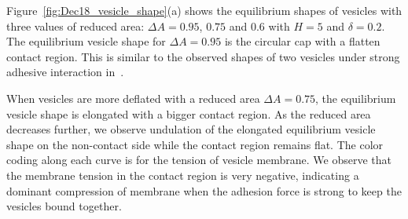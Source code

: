 \documentclass[prf,superscriptaddress,showpacs]{revtex4-1}
\begin{document}
Figure~\ref{fig:Dec18_vesicle_shape}(a) shows the equilibrium shapes of
vesicles with three values of reduced area: $\Delta A=0.95$, $0.75$ and
$0.6$ with $H=5$  and $\delta = 0.2$.  The equilibrium vesicle shape for
$\Delta A=0.95$ is the circular cap with a flatten contact region.  This
is similar to the observed shapes of two vesicles under strong adhesive
interaction
in~\cite{RamachandranAndersonLealIsraelachvili2010_Langmuir}.

When vesicles are more deflated with a reduced area  $\Delta A = 0.75$, the equilibrium vesicle shape is elongated with a bigger contact region.
As the reduced area decreases further, we observe undulation of the elongated equilibrium vesicle shape on the non-contact side while the contact region remains flat. 
The color coding along each curve is for the tension of vesicle membrane.
We observe that the membrane tension in the contact region is very negative, indicating a dominant compression of membrane when the adhesion force is strong to keep the vesicles bound together.
\end{document}
